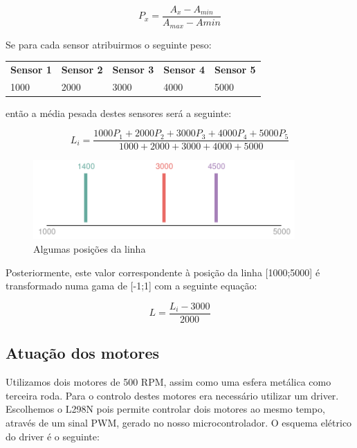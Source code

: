 \documentclass[]{report}
\begin{document}
\begin{equation*}
	P_x = \frac{A_{x} - A_{min}}{A_{max} - A{min}}
\end{equation*}

\vspace{1cm}

Se para cada sensor atribuirmos o seguinte peso:

\begin{table}[!htb]
	\centering
	
	\begin{tabular}{|l|l|l|l|l|}
		\hline
		\textbf{Sensor 1} & \textbf{Sensor 2} & \textbf{Sensor 3} & \textbf{Sensor 4} & \textbf{Sensor 5} \\
		1000 & 2000 & 3000 & 4000 & 5000 \\
		\hline
	\end{tabular}
\end{table}

\noindent então a média pesada destes sensores será a seguinte:

\begin{equation*}
	L_i = \frac{1000 P_1 + 2000 P_2 + 3000 P_3 + 4000 P_4 + 5000 P_5}{1000 + 2000 + 3000 + 4000 + 5000}
\end{equation*}

\begin{figure}[!htb]
	\centering
	\includegraphics[width=10cm]{imagens/line}
	\caption{Algumas posições da linha}
\end{figure}

Posteriormente, este valor correspondente à posição da linha [1000;5000] é transformado numa gama de [-1;1] com a seguinte equação:

\begin{equation*}
	L = \frac{L_i - 3000}{2000}
\end{equation*}

\subsection*{Atuação dos motores}
Utilizamos dois motores de 500 RPM, assim como uma esfera metálica como terceira roda. Para o controlo destes motores era necessário utilizar um driver. Escolhemos o L298N pois permite controlar dois motores ao mesmo tempo, através de um sinal PWM, gerado no nosso microcontrolador. O esquema elétrico do driver é o  seguinte:
\end{document}
